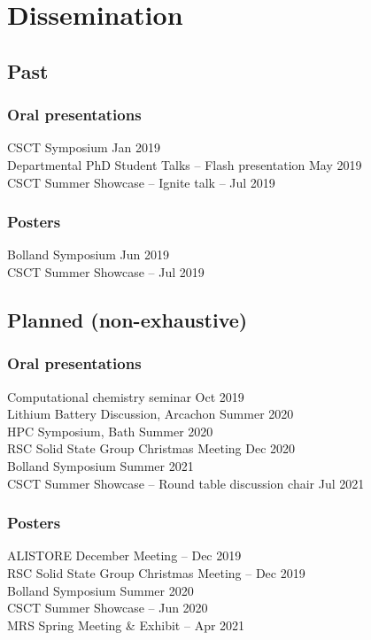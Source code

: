\vspace{-6cm}
\thispagestyle{plain}
\section*{Dissemination}
\subsection*{Past}
\subsubsection*{Oral presentations}
CSCT Symposium \dotfill {} Jan 2019\\
Departmental PhD Student Talks -- Flash presentation \dotfill {} May 2019\\
CSCT Summer Showcase -- Ignite talk \dotfill {}-- Jul 2019
\subsubsection*{Posters}
Bolland Symposium \dotfill {} Jun 2019\\
CSCT Summer Showcase \dotfill {}-- Jul 2019
\subsection*{Planned (non-exhaustive)}
\subsubsection*{Oral presentations}
Computational chemistry seminar \dotfill {} Oct 2019\\
Lithium Battery Discussion, Arcachon \dotfill Summer 2020\\
HPC Symposium, Bath \dotfill Summer 2020\\
RSC Solid State Group Christmas Meeting \dotfill Dec 2020\\
Bolland Symposium \dotfill Summer 2021\\
CSCT Summer Showcase -- Round table discussion chair \dotfill Jul 2021
\subsubsection*{Posters}
ALISTORE December Meeting \dotfill {}-- Dec 2019\\
RSC Solid State Group Christmas Meeting \dotfill {}-- Dec 2019\\
Bolland Symposium \dotfill Summer 2020\\
CSCT Summer Showcase \dotfill {}-- Jun 2020\\
MRS Spring Meeting \& Exhibit \dotfill {}-- Apr 2021\\
